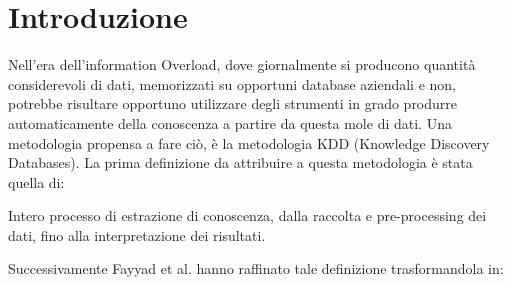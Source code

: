 \chapter{Introduzione}
Nell'era dell'information Overload, dove giornalmente si producono quantità considerevoli di dati, memorizzati su opportuni database aziendali e non, potrebbe risultare opportuno utilizzare degli strumenti in grado produrre automaticamente della conoscenza a partire da questa mole di dati. Una metodologia propensa a fare ciò, è la metodologia KDD (Knowledge Discovery Databases). 
La prima definizione da attribuire a questa metodologia è stata quella di:

\begin{mydef}
	Intero processo di estrazione di conoscenza, dalla raccolta e pre-processing dei dati, fino alla interpretazione dei risultati.\cite{DBLP:conf/kdd/1995}
\end{mydef}
Successivamente Fayyad et al. hanno raffinato tale definizione trasformandola in:

